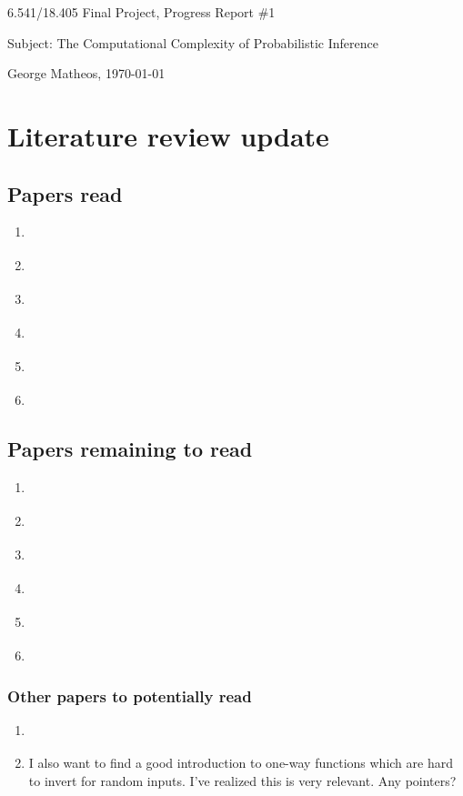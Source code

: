 \documentclass{article}
\begin{document}
\begin{center}
    \Large
    6.541/18.405 Final Project, Progress Report \#1

    \vspace{3pt}
    Subject: The Computational Complexity of Probabilistic Inference

    \vspace{3pt}
    \normalsize
    George Matheos, \today
\end{center}

\section{Literature review update}

\subsection{Papers read}

\begin{enumerate}
    \item \cite{jerrum1986}
    \item \cite{cooper1990}
    \item \cite{dagum1993}
    \item \cite{dagum1997optimal}
    \item \cite{ackerman2019computability}
    \item \cite{kwisthout2018approximate}
\end{enumerate}

\subsection{Papers remaining to read}
\begin{enumerate}
    \item \cite{akmal2022majority}
    \item \cite{tantau2022satisfaction}
    \item \cite{moitra2019approximate}
    \item \cite{aaronson2014equivalence}
    \item \cite{yamakami1999polynomial}
    \item \cite{feige2002relations}
\end{enumerate}

\subsubsection{Other papers to potentially read}
\begin{enumerate}
    \item \cite{li2021hierarchical}
    \item I also want to find a good introduction to one-way functions which are hard to invert for random inputs.  I’ve realized this is very relevant.  Any pointers?
\end{enumerate}
\end{document}
